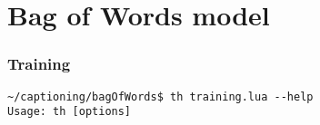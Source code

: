 \section{Bag of Words model}

\subsubsection{Training}

\begin{lstlisting}[firstnumber=1,breakindent=75pt]
~/captioning/bagOfWords$ th training.lua --help
Usage: th [options] 


\end{lstlisting}
\hspace{1cm}



